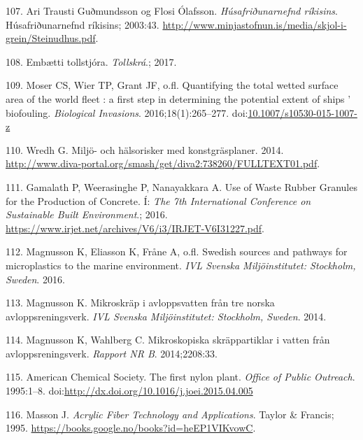 \documentclass[icelandic,]{book}
\begin{document}
\leavevmode\hypertarget{ref-Guuxf0mundsson2003}{}%
107. Ari Trausti Guðmundsson og Flosi Ólafsson. \emph{Húsafriðunarnefnd ríkisins}. Húsafriðunarnefnd ríkisins; 2003:43. \url{http://www.minjastofnun.is/media/skjol-i-grein/Steinudhus.pdf}.

\leavevmode\hypertarget{ref-tollur2017}{}%
108. Embætti tollstjóra. \emph{Tollskrá}.; 2017.

\leavevmode\hypertarget{ref-Moser2016}{}%
109. Moser CS, Wier TP, Grant JF, o.fl. Quantifying the total wetted surface area of the world fleet : a first step in determining the potential extent of ships ' biofouling. \emph{Biological Invasions}. 2016;18(1):265--277. doi:\href{https://doi.org/10.1007/s10530-015-1007-z}{10.1007/s10530-015-1007-z}

\leavevmode\hypertarget{ref-Wredh2014}{}%
110. Wredh G. Miljö- och hälsorisker med konstgräsplaner. 2014. \url{http://www.diva-portal.org/smash/get/diva2:738260/FULLTEXT01.pdf}.

\leavevmode\hypertarget{ref-Gamalath2016}{}%
111. Gamalath P, Weerasinghe P, Nanayakkara A. Use of Waste Rubber Granules for the Production of Concrete. Í: \emph{The 7th International Conference on Sustainable Built Environment}.; 2016. \url{https://www.irjet.net/archives/V6/i3/IRJET-V6I31227.pdf}.

\leavevmode\hypertarget{ref-magnusson2016swedish}{}%
112. Magnusson K, Eliasson K, Fråne A, o.fl. Swedish sources and pathways for microplastics to the marine environment. \emph{IVL Svenska Miljöinstitutet: Stockholm, Sweden}. 2016.

\leavevmode\hypertarget{ref-magnusson2014mikroskrap}{}%
113. Magnusson K. Mikroskräp i avloppsvatten från tre norska avloppsreningsverk. \emph{IVL Svenska Miljöinstitutet: Stockholm, Sweden}. 2014.

\leavevmode\hypertarget{ref-magnusson2014mikroskopiska}{}%
114. Magnusson K, Wahlberg C. Mikroskopiska skräppartiklar i vatten från avloppsreningsverk. \emph{Rapport NR B}. 2014;2208:33.

\leavevmode\hypertarget{ref-AmericanChemicalSociety1995}{}%
115. American Chemical Society. The first nylon plant. \emph{Office of Public Outreach}. 1995:1--8. doi:\href{https://doi.org/http://dx.doi.org/10.1016/j.joei.2015.04.005}{http://dx.doi.org/10.1016/j.joei.2015.04.005}

\leavevmode\hypertarget{ref-masson1995acrylic}{}%
116. Masson J. \emph{Acrylic Fiber Technology and Applications}. Taylor \& Francis; 1995. \url{https://books.google.no/books?id=heEP1VIKvowC}.
\end{document}
